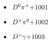 
 \begin{multicols}{3} 
 \begin{itemize}
 \item $ D^{0} \pi^{+} \hfill{+1001}$
 \item $ D^{+} \pi^{0} \hfill{+1002}$
 \item $ D^{+} \gamma \hfill{+1003}$
 \end{itemize} 
 \end{multicols} 
